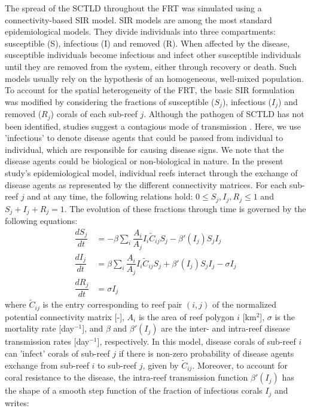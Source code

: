 \documentclass[utf8]{frontiersSCNS}
\begin{document}
The spread of the SCTLD throughout the FRT was simulated using a connectivity-based \cite{kermack1927contribution} SIR model. SIR models are among the most standard epidemiological models. They divide individuals into three compartments: susceptible (S), infectious (I) and removed (R). When affected by the disease, susceptible individuals become infectious and infect other susceptible individuals until they are removed from the system, either through recovery or death. Such models usually rely on the hypothesis of an homogeneous, well-mixed population. To account for the spatial heterogeneity of the FRT, the basic SIR formulation was modified by considering the fractions of susceptible ($S_j$), infectious ($I_j$) and removed ($R_j$) corals of each sub-reef $j$. Although the pathogen of SCTLD has not been identified, studies suggest a contagious mode of transmission \citep{aeby2019pathogenesis,muller2020spatial}. Here, we use 'infectious' to denote disease agents that could be passed from individual to individual, which are responsible for causing disease signs. We note that the disease agents could be biological or non-biological in nature. In the present study's epidemiological model, individual reefs interact through the exchange of disease agents as represented by the different connectivity matrices. For each sub-reef $j$ and at any time, the following relations hold: $0\leq S_j,I_j,R_j\leq 1$ and $S_j+I_j+R_j=1$. The evolution of these fractions through time is governed by the following equations:
\begin{equation}
    \begin{aligned}
        \dfrac{dS_j}{dt} &= -\beta\sum_i\dfrac{A_i}{A_j}I_i\tilde{C}_{ij}S_j - \beta'(I_j)S_jI_j \\
        \dfrac{dI_j}{dt} &= \beta\sum_i\dfrac{A_i}{A_j}I_i\tilde{C}_{ij}S_j + \beta'(I_j)S_jI_j - \sigma I_j \\
        \dfrac{dR_j}{dt} &= \sigma I_j
    \end{aligned}\label{eq:epidemio}
\end{equation}
where $\tilde{C}_{ij}$ is the entry corresponding to reef pair $(i,j)$ of the normalized potential connectivity matrix [-], $A_i$ is the area of reef polygon $i$ [km$^2$], $\sigma$ is the mortality rate [day$^{-1}$], and $\beta$ and $\beta'(I_j)$ are the inter- and intra-reef disease transmission rates [day$^{-1}$], respectively. In this model, disease corals of sub-reef $i$ can 'infect' corals of sub-reef $j$ if there is non-zero probability of disease agents exchange from sub-reef $i$ to sub-reef $j$, given by $\tilde{C}_{ij}$. Moreover, to account for coral resistance to the disease, the intra-reef transmission function $\beta'(I_j)$ has the shape of a smooth step function of the fraction of infectious corals $I_j$ and writes:
\end{document}
